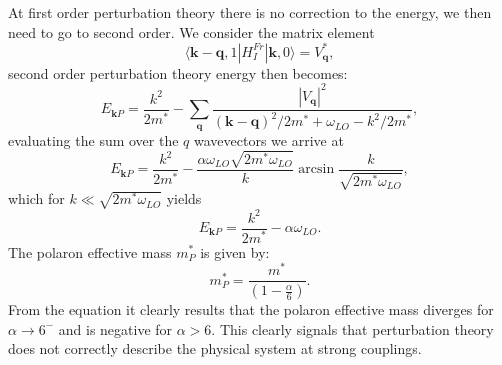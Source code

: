 \documentclass[12pt, a4paper]{report}
\numberwithin{equation}{section}
\begin{document}
At first order perturbation theory there is no correction to the energy, we then need to go to second order. We consider 
the matrix element
\begin{equation}
    \langle\mathbf{k}-\mathbf{q},1|H_I^{Fr}|\mathbf{k},0\rangle=V^*_\mathbf{q},
\end{equation}
second order perturbation theory energy then becomes:
\begin{equation}
    E_{\mathbf{k}P}=\frac{k^2}{2m^*}-\sum_{\mathbf{q}}\frac{|V_\mathbf{q}|^2}{(\mathbf{k}-\mathbf{q})^2/2m^*+\omega_{LO}-k^2/2m^*},
\end{equation}
evaluating the sum over the $q$ wavevectors we arrive at 
\begin{equation}
    E_{\mathbf{k}P}=\frac{k^2}{2m^*}-\frac{\alpha\omega_{LO}\sqrt{2m^*\omega_{LO}}}{k}\arcsin{\frac{k}{\sqrt{2m^*\omega_{LO}}}},
\end{equation}
which for $k\ll\sqrt{2m^*\omega_{LO}}$ yields
\begin{equation}
    E_{\mathbf{k}P}=\frac{k^2}{2m^*}-\alpha\omega_{LO}.
\end{equation}
The polaron effective mass $m^*_P$ is given by:
\begin{equation}
    m^*_P=\frac{m^*}{\left(1-\frac{\alpha}{6}\right)}.
\end{equation}
From the equation it clearly results that the polaron effective mass diverges for $\alpha\to 6^-$ and is negative for $\alpha>6$. This 
clearly signals that perturbation theory does not correctly describe the physical system at strong couplings.
\end{document}
